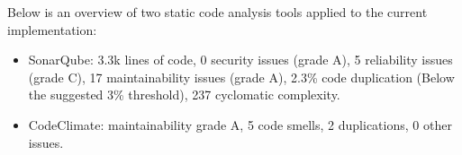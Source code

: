 Below is an overview of two static code analysis tools applied to the current implementation:
\begin{itemize}
    \item SonarQube: 3.3k lines of code, 0 security issues (grade A), 5 reliability issues
    (grade C), 17 maintainability issues (grade A), 2.3\% code duplication
    (Below the suggested 3\% threshold), 237 cyclomatic complexity.
    \item CodeClimate: maintainability grade A, 5 code smells, 2 duplications,
    0 other issues.
\end{itemize}
